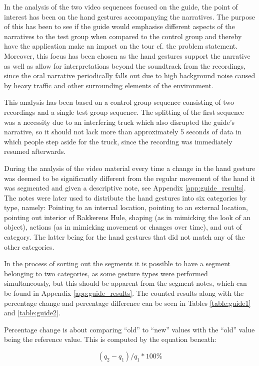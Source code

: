 In the analysis of the two video sequences focused on the guide, the point of interest has been on the hand gestures accompanying the narratives. The purpose of this has been to see if the guide would emphasise different aspects of the narratives to the test group when compared to the control group and thereby have the application make an impact on the tour cf. the problem statement. Moreover, this focus has been chosen as the hand gestures support the narrative as well as allow for interpretations beyond the soundtrack from the recordings, since the oral narrative periodically falls out due to high background noise caused by heavy traffic and other surrounding elements of the environment. 

This analysis has been based on a control group sequence consisting of two recordings and a single test group sequence. The splitting of the first sequence was a necessity due to an interfering truck which also disrupted the guide’s narrative, so it should not lack more than approximately 5 seconds of data in which people step aside for the truck, since the recording was immediately resumed afterwards.

During the analysis of the video material every time a change in the hand gesture was deemed to be significantly different from the regular movement of the hand it was segmented and given a descriptive note, see Appendix \ref{app:guide_results}. The notes were later used to distribute the hand gestures into six categories by type, namely: Pointing to an internal location, pointing to an external location, pointing out interior of Rakkerens Hule, shaping (as in mimicking the look of an object), actions (as in mimicking movement or changes over time), and out of category. The latter being for the hand gestures that did not match any of the other categories.

In the process of sorting out the segments it is possible to have a segment belonging to two categories, as some gesture types were performed simultaneously, but this should be apparent from the segment notes, which can be found in Appendix \ref{app:guide_results}. The counted results along with the percentage change and percentage difference can be seen in Tables \ref{table:guide1} and \ref{table:guide2}. 

Percentage change is about comparing “old” to “new” values with the “old” value being the reference value. This is computed by the equation beneath:

\begin{equation}
(q_2 - q_1)/q_1 * 100\% 
\end{equation}


